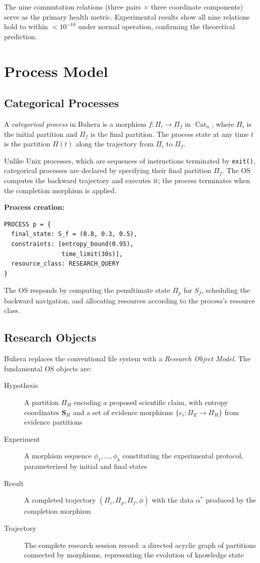 \documentclass[12pt,twocolumn]{article}
\DeclareMathOperator{\Cat}{Cat}
\begin{document}
The nine commutation relations (three pairs $\times$ three coordinate components) serve as the primary health metric. Experimental results show all nine relations hold to within $< 10^{-10}$ under normal operation, confirming the theoretical prediction.

\section{Process Model}
\label{sec:process_model}

\subsection{Categorical Processes}

A \emph{categorical process} in Buhera is a morphism $f: \Pi_i \to \Pi_f$ in $\Cat_n$, where $\Pi_i$ is the initial partition and $\Pi_f$ is the final partition. The process state at any time $t$ is the partition $\Pi(t)$ along the trajectory from $\Pi_i$ to $\Pi_f$.

Unlike Unix processes, which are sequences of instructions terminated by \texttt{exit()}, categorical processes are declared by specifying their final partition $\Pi_f$. The OS computes the backward trajectory and executes it; the process terminates when the completion morphism is applied.

\textbf{Process creation:}
\begin{verbatim}
PROCESS p = {
  final_state: S_f = (0.8, 0.3, 0.5),
  constraints: [entropy_bound(0.95),
                time_limit(30s)],
  resource_class: RESEARCH_QUERY
}
\end{verbatim}

The OS responds by computing the penultimate state $\Pi_p$ for $S_f$, scheduling the backward navigation, and allocating resources according to the process's resource class.

\subsection{Research Objects}

Buhera replaces the conventional file system with a \emph{Research Object Model}. The fundamental OS objects are:

\begin{description}
\item[Hypothesis] A partition $\Pi_H$ encoding a proposed scientific claim, with entropy coordinates $\mathbf{S}_H$ and a set of evidence morphisms $\{e_i: \Pi_E \to \Pi_H\}$ from evidence partitions
\item[Experiment] A morphism sequence $\phi_1, \ldots, \phi_k$ constituting the experimental protocol, parameterized by initial and final states
\item[Result] A completed trajectory $(\Pi_i, \Pi_p, \Pi_f, \phi)$ with the data $\alpha^*$ produced by the completion morphism
\item[Trajectory] The complete research session record: a directed acyclic graph of partitions connected by morphisms, representing the evolution of knowledge state
\end{description}
\end{document}

